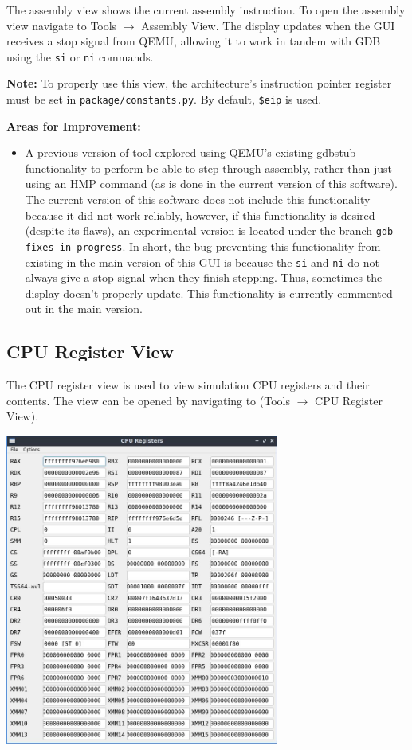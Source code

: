 \documentclass{article}
\newcommand{\code}[1]{\texttt{#1}}
\begin{document}
The assembly view shows the current assembly instruction. To open the assembly view navigate to Tools $\rightarrow$ Assembly View. The display updates when the GUI receives a stop signal from QEMU, allowing it to work in tandem with GDB using the \code{si} or \code{ni} commands.\par
\textbf{Note:} To properly use this view, the architecture's instruction pointer register must be set in \code{package/constants.py}. By default, \code{\$eip} is used.\par
\textbf{Areas for Improvement:}
\begin{itemize}
    \item A previous version of tool explored using QEMU's existing gdbstub functionality to perform be able to step through assembly, rather than just using an HMP command (as is done in the current version of this software). The current version of this software does not include this functionality because it did not work reliably, however, if this functionality is desired (despite its flaws), an experimental version is located under the branch \code{gdb-fixes-in-progress}. In short, the bug preventing this functionality from existing in the main version of this GUI is because the \code{si} and \code{ni} do not always give a stop signal when they finish stepping. Thus, sometimes the display doesn't properly update. This functionality is currently commented out in the main version.
\end{itemize}

\subsection{CPU Register View}
The CPU register view is used to view simulation CPU registers and their contents. The view can be opened by navigating to (Tools $\rightarrow$ CPU Register View). 

\begin{center}
    \includegraphics[width=90mm]{images/registers_fancy.jpg}
\end{center}
\end{document}
